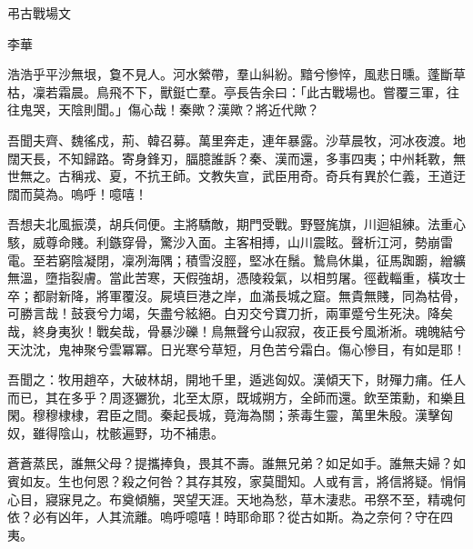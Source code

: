 弔古戰場文

李華

浩浩乎平沙無垠，敻不見人。河水縈帶，羣山糾紛。黯兮慘悴，風悲日曛。蓬斷草枯，凜若霜晨。鳥飛不下，獸鋌亡羣。亭長告余曰：「此古戰場也。嘗覆三軍，往往鬼哭，天陰則聞。」傷心哉！秦歟？漢歟？將近代歟？

吾聞夫齊、魏徭戍，荊、韓召募。萬里奔走，連年暴露。沙草晨牧，河冰夜渡。地闊天長，不知歸路。寄身鋒刃，腷臆誰訴？秦、漢而還，多事四夷；中州耗斁，無世無之。古稱戎、夏，不抗王師。文教失宣，武臣用奇。奇兵有異於仁義，王道迂闊而莫為。嗚呼！噫嘻！

吾想夫北風振漠，胡兵伺便。主將驕敵，期門受戰。野豎旄旗，川迴組練。法重心駭，威尊命賤。利鏃穿骨，驚沙入面。主客相搏，山川震眩。聲析江河，勢崩雷電。至若窮陰凝閉，凜冽海隅；積雪沒脛，堅冰在鬚。鷙鳥休巢，征馬踟躕，繒纊無溫，墮指裂膚。當此苦寒，天假強胡，憑陵殺氣，以相剪屠。徑截輜重，橫攻士卒；都尉新降，將軍覆沒。屍填巨港之岸，血滿長城之窟。無貴無賤，同為枯骨，可勝言哉！鼓衰兮力竭，矢盡兮絃絕。白刃交兮寶刀折，兩軍蹙兮生死決。降矣哉，終身夷狄！戰矣哉，骨暴沙礫！鳥無聲兮山寂寂，夜正長兮風淅淅。魂魄結兮天沈沈，鬼神聚兮雲冪冪。日光寒兮草短，月色苦兮霜白。傷心慘目，有如是耶！

吾聞之：牧用趙卒，大破林胡，開地千里，遁逃匈奴。漢傾天下，財殫力痡。任人而已，其在多乎？周逐玁狁，北至太原，既城朔方，全師而還。飲至策勳，和樂且閑。穆穆棣棣，君臣之間。秦起長城，竟海為關；荼毒生靈，萬里朱殷。漢擊匈奴，雖得陰山，枕骸遍野，功不補患。

蒼蒼蒸民，誰無父母？提攜捧負，畏其不壽。誰無兄弟？如足如手。誰無夫婦？如賓如友。生也何恩？殺之何咎？其存其歿，家莫聞知。人或有言，將信將疑。悁悁心目，寢寐見之。布奠傾觴，哭望天涯。天地為愁，草木淒悲。弔祭不至，精魂何依？必有凶年，人其流離。嗚呼噫嘻！時耶命耶？從古如斯。為之奈何？守在四夷。
